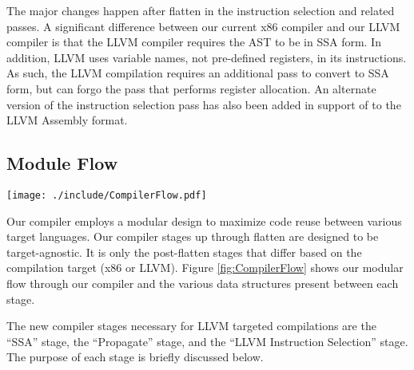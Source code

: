 \documentclass[11pt,twocolumn]{article}
\begin{document}
The major changes happen after flatten in the instruction selection
and related passes. A significant difference between our current x86
compiler and our LLVM compiler is that the LLVM compiler requires the
AST to be in SSA form. In addition, LLVM uses variable names, not
pre-defined registers, in its instructions. As such, the LLVM
compilation requires an additional pass to convert to SSA form, but
can forgo the pass that performs register allocation.  An alternate
version of the instruction selection pass has also been added in
support of to the LLVM Assembly format.

\subsection{Module Flow}
\label{sec:ModuleFlow}

\begin{figure*}[htb]
   \centering
   \texttt{[image: ./include/CompilerFlow.pdf]}
   \caption{Compiler Data Flow}
   \label{fig:CompilerFlow}
\end{figure*}

Our compiler employs a modular design to maximize code reuse between
various target languages.  Our compiler stages up through flatten are
designed to be target-agnostic. It is only the post-flatten stages
that differ based on the compilation target (x86 or LLVM). Figure
\ref{fig:CompilerFlow} shows our modular flow through our compiler and
the various data structures present between each stage.

The new compiler stages necessary for LLVM targeted compilations are
the ``SSA'' stage, the ``Propagate'' stage, and the ``LLVM Instruction
Selection'' stage. The purpose of each stage is briefly discussed
below.
\end{document}
